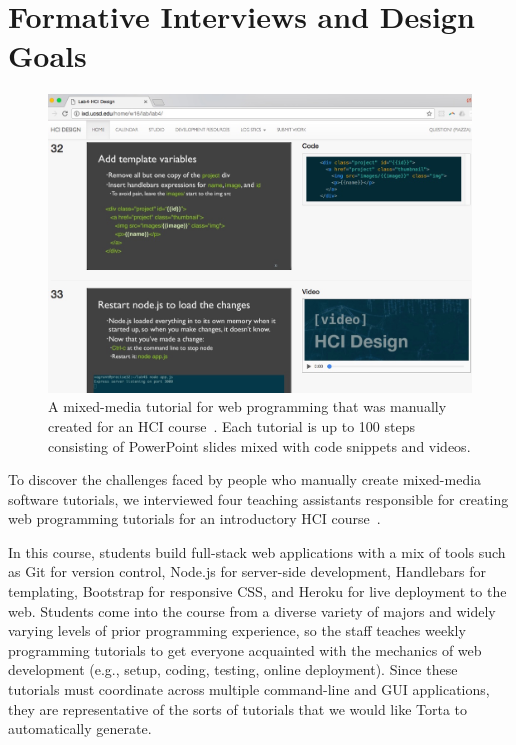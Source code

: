 
\section{Formative Interviews and Design Goals}

\begin{figure}
\includegraphics[width=\columnwidth]{figures/torta/ixd-lab-slides.jpg}

\caption{A mixed-media tutorial for web programming that was manually
created for an HCI course~{\protect \cite{ixd}}. Each tutorial is up to
100 steps consisting of PowerPoint slides mixed with code snippets and
videos.}

\vspace{-1em} %

\label{fig:ixd-lab-slides}
\end{figure}

To discover the challenges faced by people who manually create
mixed-media software tutorials, we interviewed four teaching
assistants responsible for creating web programming tutorials for an
introductory HCI course~\cite{ixd}.


In this course, students build full-stack web applications with a mix of
tools such as Git for version control, Node.js for server-side
development, Handlebars for templating, Bootstrap for responsive CSS,
and Heroku for live deployment to the web. Students come into the course
from a diverse variety of majors and widely varying levels of prior programming
experience, so the staff teaches weekly programming tutorials to get
everyone acquainted with the mechanics of web development (e.g., setup,
coding, testing, online deployment). Since these tutorials must
coordinate across multiple command-line and GUI applications, they are
representative of the sorts of tutorials that we would like Torta to
automatically generate.

